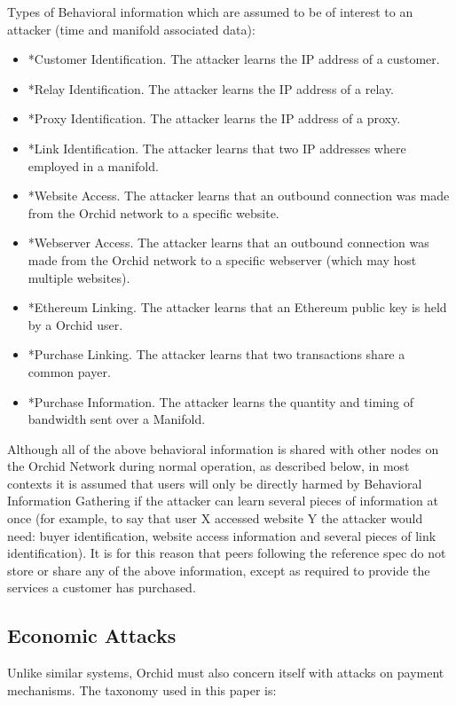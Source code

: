 \documentclass{article}
\newcommand{\orchid}{Orchid}
\newcommand{\Orchid}{\orchid}
\begin{document}
Types of Behavioral information which are assumed to be of interest to an attacker (time and manifold associated data):

\begin{itemize}
\item *Customer Identification. The attacker learns the IP address of a customer.
\item *Relay Identification. The attacker learns the IP address of a relay.
\item *Proxy Identification. The attacker learns the IP address of a proxy.
\item *Link Identification. The attacker learns that two IP addresses where employed in a manifold.
\item *Website Access. The attacker learns that an outbound connection was made from the \Orchid{} network to a specific website.
\item *Webserver Access. The attacker learns that an outbound connection was made from the \Orchid{} network to a specific webserver (which may host multiple websites).
\item *Ethereum Linking. The attacker learns that an Ethereum public key is held by a \Orchid{} user.
\item *Purchase Linking. The attacker learns that two transactions share a common payer.
\item *Purchase Information. The attacker learns the quantity and timing of bandwidth sent over a Manifold.
\end{itemize}

Although all of the above behavioral information is shared with other nodes on the \Orchid{} Network during normal operation, as described below, in most contexts it is assumed that users will only be directly harmed by Behavioral Information Gathering if the attacker can learn several pieces of information at once (for example, to say that user X accessed website Y the attacker would need: buyer identification, website access information and several pieces of link identification). It is for this reason that peers following the reference spec do not store or share any of the above information, except as required to provide the services a customer has purchased.

\subsection{Economic Attacks}
\label{econ-attacks}

Unlike similar systems, \Orchid{} must also concern itself with attacks on payment mechanisms. The taxonomy used in this paper is:
\end{document}
